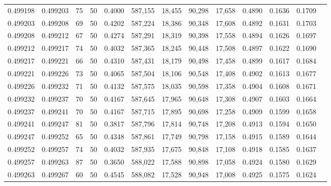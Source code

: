\begin{tabular}{rrrrrrrrrrrrr}
0.499198 & 0.499203 &    75 &  50 &                                     0.4000 & 587,155 &  18,455 &  90,298 &  17,658 & 0.4890 & 0.1636 & 0.1709 \\
0.499203 & 0.499208 &    69 &  50 &                                     0.4202 & 587,224 &  18,386 &  90,348 &  17,608 & 0.4892 & 0.1631 & 0.1703 \\
0.499208 & 0.499212 &    67 &  50 &                                     0.4274 & 587,291 &  18,319 &  90,398 &  17,558 & 0.4894 & 0.1626 & 0.1697 \\
0.499212 & 0.499217 &    74 &  50 &                                     0.4032 & 587,365 &  18,245 &  90,448 &  17,508 & 0.4897 & 0.1622 & 0.1690 \\
0.499217 & 0.499221 &    66 &  50 &                                     0.4310 & 587,431 &  18,179 &  90,498 &  17,458 & 0.4899 & 0.1617 & 0.1684 \\
0.499221 & 0.499226 &    73 &  50 &                                     0.4065 & 587,504 &  18,106 &  90,548 &  17,408 & 0.4902 & 0.1613 & 0.1677 \\
0.499226 & 0.499232 &    71 &  50 &                                     0.4132 & 587,575 &  18,035 &  90,598 &  17,358 & 0.4904 & 0.1608 & 0.1671 \\
0.499232 & 0.499237 &    70 &  50 &                                     0.4167 & 587,645 &  17,965 &  90,648 &  17,308 & 0.4907 & 0.1603 & 0.1664 \\
0.499237 & 0.499241 &    70 &  50 &                                     0.4167 & 587,715 &  17,895 &  90,698 &  17,258 & 0.4909 & 0.1599 & 0.1658 \\
0.499241 & 0.499247 &    81 &  50 &                                     0.3817 & 587,796 &  17,814 &  90,748 &  17,208 & 0.4913 & 0.1594 & 0.1650 \\
0.499247 & 0.499252 &    65 &  50 &                                     0.4348 & 587,861 &  17,749 &  90,798 &  17,158 & 0.4915 & 0.1589 & 0.1644 \\
0.499252 & 0.499257 &    74 &  50 &                                     0.4032 & 587,935 &  17,675 &  90,848 &  17,108 & 0.4918 & 0.1585 & 0.1637 \\
0.499257 & 0.499263 &    87 &  50 &                                     0.3650 & 588,022 &  17,588 &  90,898 &  17,058 & 0.4924 & 0.1580 & 0.1629 \\
0.499263 & 0.499267 &    60 &  50 &                                     0.4545 & 588,082 &  17,528 &  90,948 &  17,008 & 0.4925 & 0.1575 & 0.1624 \\

\end{tabular}
